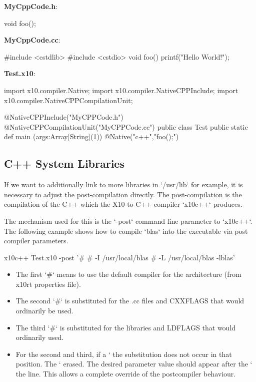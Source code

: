 {\bf MyCppCode.h}: 
\begin{xten}
void foo();
\end{xten}


{\bf MyCppCode.cc}:
\begin{xten}
#include <cstdlib>
#include <cstdio>
void foo() {
    printf("Hello World!\n");
}
\end{xten}

{\bf Test.x10}:
\begin{xten}
import x10.compiler.Native;
import x10.compiler.NativeCPPInclude;
import x10.compiler.NativeCPPCompilationUnit;

@NativeCPPInclude("MyCPPCode.h")
@NativeCPPCompilationUnit("MyCPPCode.cc")
public class Test {
    public static def main (args:Array[String](1)) {
        { @Native("c++","foo();") {} }
    }
}
\end{xten}

\subsection{C++ System Libraries}

If we want to additionally link to more libraries in \xcd`/usr/lib` for
example, it is necessary to adjust the post-compilation directly.  The
post-compilation is the compilation of the C++ which the X10-to-C++ compiler
\xcd`x10c++` produces.  

The mechanism used for this is the \xcd`-post` command line parameter to
\xcd`x10c++`. The following example shows how to compile \xcd`blas` into the
executable via post compiler parameters.

\begin{xten}
x10c++ Test.x10 -post '# # -I /usr/local/blas # -L /usr/local/blas -lblas'
\end{xten}

\begin{itemize}
\item The first \xcd`#` means to use the default compiler for the architecture (from
      x10rt properties file). 
\item The second \xcd`#` is substituted for the .cc files and CXXFLAGS that would
      ordinarily be used. 
\item The third \xcd`#` is substituted for the libraries and LDFLAGS that would
      ordinarily used.
\item For the second and third, if a \xcd`%
      the substitution does not occur in that position.  The \xcd`%
      erased.  The desired parameter value should appear after the \xcd`%
      the line. This allows a complete override of the postcompiler behaviour.
\end{itemize}


